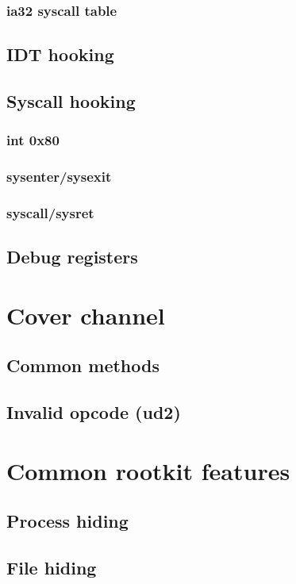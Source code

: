 \documentclass{article}
\begin{document}
\subsubsection{ia32 syscall table}

\subsection{IDT hooking}

\subsection{Syscall hooking}
\subsubsection{int 0x80}
\subsubsection{sysenter/sysexit}
\subsubsection{syscall/sysret}

\subsection{Debug registers}

\section{Cover channel}
\subsection{Common methods}
\subsection{Invalid opcode (ud2)}

\section{Common rootkit features}
\subsection{Process hiding}
\subsection{File hiding}
\end{document}
